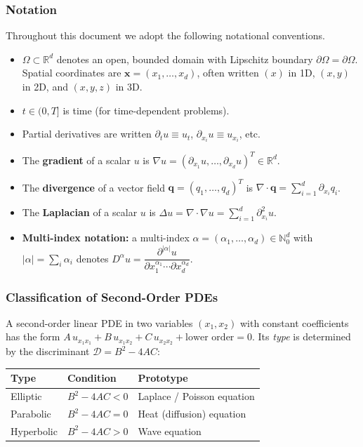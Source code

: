 \documentclass[11pt]{article}
\newcommand{\R}{\mathbb{R}}
\newcommand{\domain}{\Omega}
\newcommand{\boundary}{\partial\Omega}
\begin{document}
\subsubsection{Notation}

Throughout this document we adopt the following notational conventions.

\begin{itemize}
  \item $\domain \subset \R^d$ denotes an open, bounded domain with
    Lipschitz boundary $\boundary = \partial\domain$.
    Spatial coordinates are $\mathbf{x} = (x_1,\ldots,x_d)$, often
    written $(x)$ in 1D, $(x,y)$ in 2D, and $(x,y,z)$ in 3D.
  \item $t \in (0,T]$ is time (for time-dependent problems).
  \item Partial derivatives are written $\partial_t u \equiv u_t$,
    $\partial_{x_i} u \equiv u_{x_i}$, etc.
  \item The \textbf{gradient} of a scalar $u$ is
    $\nabla u = (\partial_{x_1}u, \ldots, \partial_{x_d}u)^T \in \R^d$.
  \item The \textbf{divergence} of a vector field
    $\mathbf{q} = (q_1,\ldots,q_d)^T$ is
    $\nabla\cdot\mathbf{q} = \sum_{i=1}^d \partial_{x_i} q_i$.
  \item The \textbf{Laplacian} of a scalar $u$ is
    $\Delta u = \nabla\cdot\nabla u = \sum_{i=1}^d \partial_{x_i}^2 u$.
  \item \textbf{Multi-index notation:} a multi-index $\alpha =
    (\alpha_1,\ldots,\alpha_d) \in \mathbb{N}_0^d$ with
    $|\alpha| = \sum_i \alpha_i$ denotes
    $D^\alpha u = \dfrac{\partial^{|\alpha|} u}{\partial x_1^{\alpha_1}
    \cdots \partial x_d^{\alpha_d}}$.
\end{itemize}

\subsubsection{Classification of Second-Order PDEs}

A second-order linear PDE in two variables $(x_1, x_2)$ with constant
coefficients has the form
$A\,u_{x_1 x_1} + B\,u_{x_1 x_2} + C\,u_{x_2 x_2} + \text{lower order} = 0$.
Its \emph{type} is determined by the discriminant $\mathcal{D} = B^2 - 4AC$:

\begin{center}
\begin{tabular}{lll}
\toprule
\textbf{Type} & \textbf{Condition} & \textbf{Prototype} \\
\midrule
Elliptic   & $B^2 - 4AC < 0$ & Laplace / Poisson equation \\
Parabolic  & $B^2 - 4AC = 0$ & Heat (diffusion) equation \\
Hyperbolic & $B^2 - 4AC > 0$ & Wave equation \\
\bottomrule
\end{tabular}
\end{center}
\end{document}

